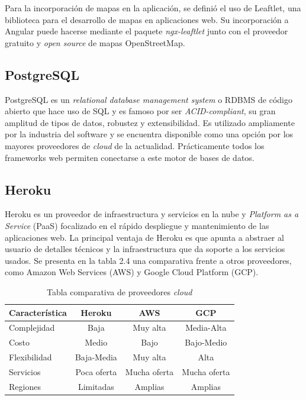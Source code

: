 Para la incorporación de mapas en la aplicación, se definió el uso de Leaftlet, una biblioteca para el desarrollo de mapas en aplicaciones web. Su incorporación a Angular puede hacerse mediante el paquete \textit{ngx-leaftlet}\citep{LEAFLET:1} junto con el proveedor gratuito y \textit{open source} de mapas OpenStreetMap.

\subsection{PostgreSQL}

PostgreSQL es un \textit{relational database management system} o RDBMS de código abierto que hace uso de SQL y es famoso por ser \textit{ACID-compliant}, su gran amplitud de tipos de datos, robustez y extensibilidad\citep{POSTGRES:1}. Es utilizado ampliamente por la industria del software\citep{POSTGRES:2} y se encuentra disponible como una opción por los mayores proveedores de \textit{cloud} de la actualidad. Prácticamente todos los frameworks web permiten conectarse a este motor de bases de datos. 

\subsection{Heroku}

Heroku es un proveedor de infraestructura y servicios en la nube y \textit{Platform as a Service} (PaaS) focalizado en el rápido despliegue y mantenimiento de las aplicaciones web. La principal ventaja de Heroku es que apunta a abstraer al usuario de detalles técnicos y la infraestructura que da soporte a los servicios usados. Se presenta en la tabla 2.4 una comparativa frente a otros proveedores, como Amazon Web Services (AWS) y Google Cloud Platform (GCP).


\begin{table}[H]
	\centering
	\caption[Tabla comparativa]{Tabla comparativa de proveedores \textit{cloud}\citep{CLOUD:1}\citep{CLOUD:2}\citep{CLOUD:3}}
	\begin{tabular}{l c c c}    
		\toprule
		\textbf{Característica} 	 & \textbf{Heroku} & \textbf{AWS} & \textbf{GCP} \\
		\midrule
		Complejidad & Baja & Muy alta & Media-Alta \\		
		Costo & Medio & Bajo & Bajo-Medio			\\		
		Flexibilidad & Baja-Media & Muy alta & Alta \\
		Servicios & Poca oferta & Mucha oferta & Mucha oferta 	\\
		Regiones & Limitadas & Amplias & Amplias \\
		\bottomrule
		\hline
	\end{tabular}
	\label{tab:peces}
\end{table}

